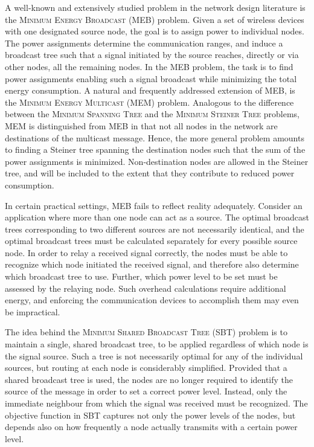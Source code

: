 A well-known and extensively studied problem in the network design literature is the \textsc{Minimum Energy Broadcast} (MEB) problem.
Given a set of wireless devices with one designated source node, the goal is to assign power to individual nodes.
The power assignments determine the communication ranges, and induce a broadcast tree such that a signal initiated by the source reaches, directly or via other nodes,
all the remaining nodes.
In the MEB problem, the task is to find power assignments enabling such a signal broadcast while minimizing the total energy consumption.
A natural and frequently addressed extension of MEB, is the \textsc{Minimum Energy Multicast} (MEM) problem.
Analogous to the difference between the \textsc{Minimum Spanning Tree} and the \textsc{Minimum Steiner Tree} problems,
MEM is distinguished from MEB in that not all nodes in the network are destinations of the multicast message.
Hence, the more general problem amounts to finding a Steiner tree spanning the destination nodes such that the sum of the power assignments is minimized.
Non-destination nodes are allowed in the Steiner tree, and will be included to the extent that they contribute to reduced power consumption.

In certain practical settings, MEB fails to reflect reality adequately.
Consider an application where more than one node can act as a source.
The optimal broadcast trees corresponding to two different sources are not necessarily identical,
and the optimal broadcast trees must be calculated separately for every possible source node.
In order to relay a received signal correctly, the nodes must be able to recognize which node initiated the received signal, and therefore also determine which broadcast tree to use.
Further, which power level to be set must be assessed by the relaying node.
Such overhead calculations require additional energy, and enforcing the communication devices to accomplish them may even be impractical.

The idea behind the \textsc{Minimum Shared Broadcast Tree} (SBT) problem is to maintain a single, shared broadcast tree, to be applied regardless of which node is the signal source.
Such a tree is not necessarily optimal for any of the individual sources, but routing at each node is considerably simplified.
Provided that a shared broadcast tree is used, the nodes are no longer required to identify the source of the message in order to set a correct power level.
Instead, only the immediate neighbour from which the signal was received must be recognized.
The objective function in SBT captures not only the power levels of the nodes, but depends also on how frequently a node actually transmits with a certain power level.

